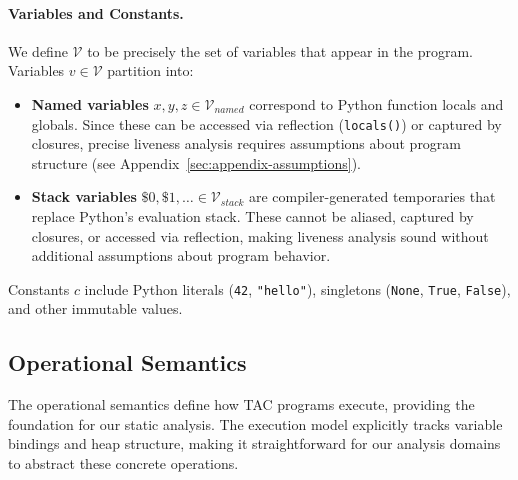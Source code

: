 \paragraph{Variables and Constants.}
We define $\mathcal{V}$ to be precisely the set of variables that appear in the program. Variables $v \in \mathcal{V}$ partition into:
\begin{itemize}
    \item \textbf{Named variables} $x,y,z \in \mathcal{V}_{\mathit{named}}$ correspond to Python function locals and globals. Since these can be accessed via reflection (\texttt{locals()}) or captured by closures, precise liveness analysis requires assumptions about program structure (see Appendix~\ref{sec:appendix-assumptions}).
    \item \textbf{Stack variables} $\mathsf{\$}0,\mathsf{\$}1,\ldots \in \mathcal{V}_{\mathit{stack}}$ are compiler-generated temporaries that replace Python's evaluation stack. These cannot be aliased, captured by closures, or accessed via reflection, making liveness analysis sound without additional assumptions about program behavior.
\end{itemize}
Constants $c$ include Python literals (\texttt{42}, \texttt{"hello"}), singletons (\texttt{None}, \texttt{True}, \texttt{False}), and other immutable values.

\subsection{Operational Semantics}
The operational semantics define how TAC programs execute, providing the foundation for our static analysis. The execution model explicitly tracks variable bindings and heap structure, making it straightforward for our analysis domains to abstract these concrete operations.

